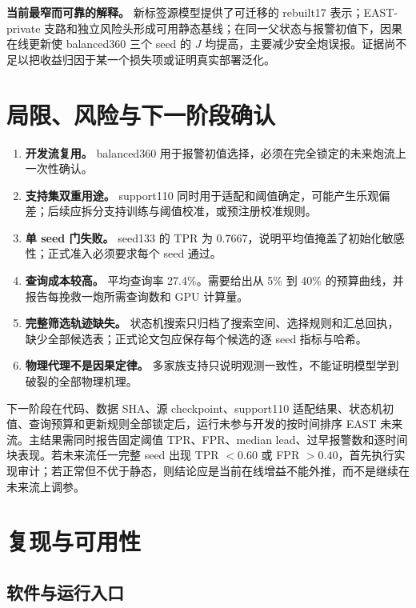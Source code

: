 \begin{decisionbox}
\textbf{当前最窄而可靠的解释。} 新标签源模型提供了可迁移的 rebuilt17 表示；EAST-private 支路和独立风险头形成可用静态基线；在同一父状态与报警初值下，因果在线更新使 balanced360 三个 seed 的 $J$ 均提高，主要减少安全炮误报。证据尚不足以把收益归因于某一个损失项或证明真实部署泛化。
\end{decisionbox}

\section{局限、风险与下一阶段确认}

\begin{enumerate}[label=\textbf{L\arabic*.}]
  \item \textbf{开发流复用。} balanced360 用于报警初值选择，必须在完全锁定的未来炮流上一次性确认。
  \item \textbf{支持集双重用途。} support110 同时用于适配和阈值确定，可能产生乐观偏差；后续应拆分支持训练与阈值校准，或预注册校准规则。
  \item \textbf{单 seed 门失败。} seed133 的 TPR 为 0.7667，说明平均值掩盖了初始化敏感性；正式准入必须要求每个 seed 通过。
  \item \textbf{查询成本较高。} 平均查询率 27.4\%。需要给出从 5\% 到 40\% 的预算曲线，并报告每挽救一炮所需查询数和 GPU 计算量。
  \item \textbf{完整筛选轨迹缺失。} 状态机搜索只归档了搜索空间、选择规则和汇总回执，缺少全部候选表；正式论文包应保存每个候选的逐 seed 指标与哈希。
  \item \textbf{物理代理不是因果定律。} 多家族支持只说明观测一致性，不能证明模型学到破裂的全部物理机理。
\end{enumerate}

下一阶段在代码、数据 SHA、源 checkpoint、support110 适配结果、状态机初值、查询预算和更新规则全部锁定后，运行未参与开发的按时间排序 EAST 未来流。主结果需同时报告固定阈值 TPR、FPR、median lead、过早报警数和逐时间块表现。若未来流任一完整 seed 出现 TPR $<0.60$ 或 FPR $>0.40$，首先执行实现审计；若正常但不优于静态，则结论应是当前在线增益不能外推，而不是继续在未来流上调参。

\section{复现与可用性}

\subsection{软件与运行入口}

